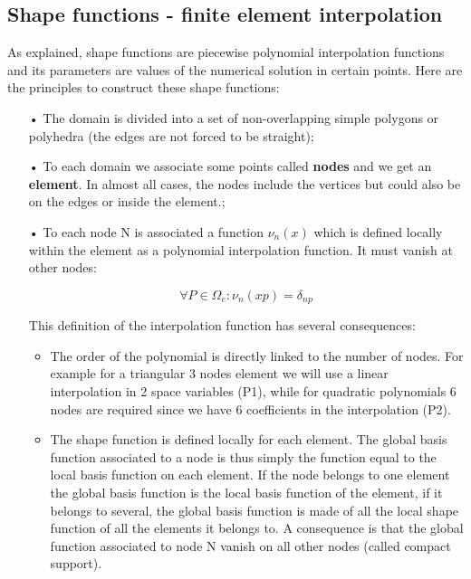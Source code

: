 \subsection{Shape functions - finite element interpolation}

As explained, shape functions are piecewise polynomial interpolation functions and its parameters are values of the numerical solution in certain points. Here are the principles to construct these shape functions: \\

\begin{itemize}
\item[•] The domain is divided into a set of non-overlapping simple polygons or polyhedra (the edges are not forced to be straight);
\item[•] To each domain we associate some points called \textbf{nodes} and we get an \textbf{element}. In almost all cases, the nodes include the vertices but could also be on the edges or inside the element.; 
\item[•] To each node N is associated a function $\nu_n (x)$ which is defined locally within the element as a polynomial interpolation function. It must vanish at other nodes: 

\begin{equation}
\forall P \in \Omega _e : \nu _n(xp) = \delta _{np}
\end{equation} 

This definition of the interpolation function has several consequences: 

\begin{itemize}
\item The order of the polynomial is directly linked to the number of nodes. For example for a triangular 3 nodes element we will use a linear interpolation in 2 space variables (P1), while for quadratic polynomials 6 nodes are required since we have 6 coefficients in the interpolation (P2). \\

\item The shape function is defined locally for each element. The global basis function associated to a node is thus simply the function equal to the local basis function on each element. If the node belongs to one element the global basis function is the local basis function of the element, if it belongs to several, the global basis function is made of all the local shape function of all the elements it belongs to. A consequence is that the global function associated to node N vanish on all other nodes (called compact support). \\


\end{itemize}
\end{itemize}
